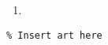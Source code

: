 \documentclass{article}
\begin{document}
\begin{enumerate}[itemsep=\fill]
\item %

\end{enumerate}


\centering
\small
\begin{BVerbatim}
\end{BVerbatim}
\end{document}
